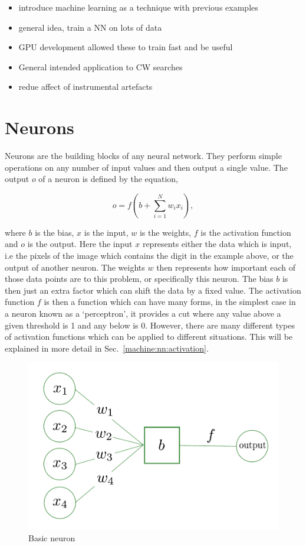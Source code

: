 \begin{itemize}
    \item introduce machine learning as a technique with previous examples
    \item general idea, train a NN on lots of data
    \item GPU development allowed these to train fast and be useful
    \item General intended application to CW searches
    \item redue affect of instrumental artefacts
\end{itemize}

\section{\label{machine:nn:neuron}Neurons}
Neurons are the building blocks of any neural network.
They perform simple operations on any number of input values and then output a single value.
The output $o$ of a neuron is defined by the equation,

\begin{equation}
    o = f\left(b + \sum_{i=1}^{N} w_i x_i  \right),
    \label{machine:nn:neuron:equation}
\end{equation}

where $b$ is the bias, $x$ is the input, $w$ is the weights, $f$ is the activation function and $o$ is the output.
Here the input $x$ represents either the data which is input, i.e the pixels of the image which contains the digit in the example above, or the output of another neuron.
The weights $w$ then represents how important each of those data points are to this problem, or specifically this neuron. 
The bias $b$ is then just an extra factor which can shift the data by a fixed value.
The activation function $f$ is then a function which can have many forms, in the simplest case in a neuron known as a `perceptron', it provides a cut where any value above a given threshold is 1 and any below is 0. 
However, there are many different types of activation functions which can be applied to different situations.
This will be explained in more detail in Sec.~\ref{machine:nn:activation}.

\begin{figure}[h]
    \centering
    \includegraphics[width=0.6\columnwidth]{C3_cnn/neuron.pdf}
    \caption{Basic neuron}
    \label{machine:nn:neuron:plot}
\end{figure}

